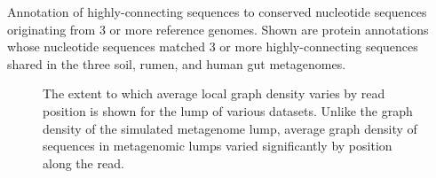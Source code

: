 \documentclass[11pt]{article} %
\begin{document}
\begin{table}
\caption{Annotation of highly-connecting sequences to conserved nucleotide sequences originating from 3 or more reference genomes.  Shown are protein annotations whose nucleotide sequences matched 3 or more highly-connecting sequences shared in the three soil, rumen, and human gut metagenomes.}
\end{table}

\begin{figure}
\caption{The extent to which average local graph density varies by read position is shown for the lump of various datasets.  Unlike the graph density of the simulated metagenome lump, average graph density of sequences in metagenomic lumps varied significantly by position along the read.}
\end{figure}
\end{document}
